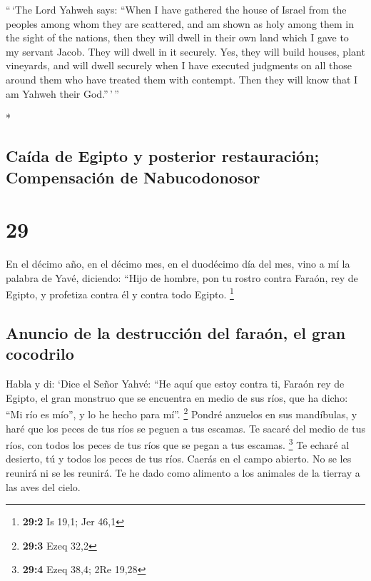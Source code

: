 \begin{paracol}{2}
\begin{otherlanguage}{english}
 ``\,`The Lord Yahweh says: ``When I have gathered the
house of Israel from the peoples among whom they are scattered, and am
shown as holy among them in the sight of the nations, then they will
dwell in their own land which I gave to my servant Jacob.
 They will dwell in it securely. Yes, they will build
houses, plant vineyards, and will dwell securely when I have executed
judgments on all those around them who have treated them with contempt.
Then they will know that I am Yahweh their God.''\,'\,''

\end{otherlanguage}

\switchcolumn[0]*

\hypertarget{cauxedda-de-egipto-y-posterior-restauraciuxf3n-compensaciuxf3n-de-nabucodonosor}{%
\subsection{Caída de Egipto y posterior restauración; Compensación de
Nabucodonosor}\label{cauxedda-de-egipto-y-posterior-restauraciuxf3n-compensaciuxf3n-de-nabucodonosor}}

\hypertarget{section-56}{%
\section{29}\label{section-56}}

 En el décimo año, en el décimo mes, en el duodécimo día
del mes, vino a mí la palabra de Yavé, diciendo:  ``Hijo
de hombre, pon tu rostro contra Faraón, rey de Egipto, y profetiza
contra él y contra todo Egipto. \footnote{\textbf{29:2} Is 19,1; Jer
  46,1}

\hypertarget{anuncio-de-la-destrucciuxf3n-del-farauxf3n-el-gran-cocodrilo}{%
\subsection{Anuncio de la destrucción del faraón, el gran
cocodrilo}\label{anuncio-de-la-destrucciuxf3n-del-farauxf3n-el-gran-cocodrilo}}

 Habla y di: `Dice el Señor Yahvé: ``He aquí que estoy
contra ti, Faraón rey de Egipto, el gran monstruo que se encuentra en
medio de sus ríos, que ha dicho: ``Mi río es mío'', y lo he hecho para
mí''. \footnote{\textbf{29:3} Ezeq 32,2}  Pondré anzuelos
en sus mandíbulas, y haré que los peces de tus ríos se peguen a tus
escamas. Te sacaré del medio de tus ríos, con todos los peces de tus
ríos que se pegan a tus escamas. \footnote{\textbf{29:4} Ezeq 38,4; 2Re
  19,28}  Te echaré al desierto, tú y todos los peces de
tus ríos. Caerás en el campo abierto. No se les reunirá ni se les
reunirá. Te he dado como alimento a los animales de la tierray a las
aves del cielo.


\end{paracol}
